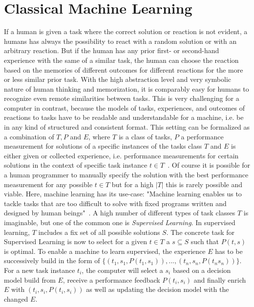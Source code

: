 \section{Classical Machine Learning}
\label{sec:theory:ml}
If a human is given a task where the correct solution or reaction is not evident, a humans has always the possibility to react with a random solution or with an arbitrary reaction.
But if the human has any prior first- or second-hand experience with the same of a similar task, the human can choose the reaction based on the memories of different outcomes for different reactions for the more or less similar prior task.
With the high abstraction level and very symbolic nature of human thinking and memorization, it is comparably easy for humans to recognize even remote similarities between tasks.\newline
This is very challenging for a computer in contrast, because the models of tasks, experiences, and outcomes of reactions to tasks have to be readable and understandable for a machine, i.e. be in any kind of structured and consistent format.
This setting can be formalized as a combination of $T, P$ and $E$, where $T$ is a class of tasks, $P$ a performance measurement for solutions of a specific instances of the tasks class $T$ and $E$ is either given or collected experience, i.e. performance measurements for certain solutions in the context of specific task instance $t\in T$~\cite{Mitchell-MachineLearning}.\newline
Of course it is possible for a human programmer to manually specify the solution with the best performance measurement for any possible $t\in T$ but for a high $|T|$ this is rarely possible and viable.
Here, machine learning has its use-case: "Machine learning enables us to tackle tasks that are too difficult to solve with fixed programs written and designed by human beings"~\cite{Goodfellow-DeepLearning}.\newline
A high number of different types of task classes $T$ is imaginable, but one of the common one is \textit{Supervised Learning}.
In supervised learning, $T$ includes a fix set of all possible solutions $S$.
The concrete task for Supervised Learning is now to select for a given $t\in T$ a $s\subseteq S$ such that $P(t,s)$ is optimal.
To enable a machine to learn supervised, the experience $E$ has to be successively build in the form of $\{(t_1, s_1, P(t_1, s_1)), ..., (t_n, s_n, P(t_n s_n))\}$.
For a new task instance $t_i$, the computer will select a $s_i$ based on a decision model build from $E$, receive a performance feedback $P(t_i, s_i)$ and finally enrich $E$ with $(t_i, s_i, P(t_i, s_i))$ as well as updating the decision model with the changed $E$.

